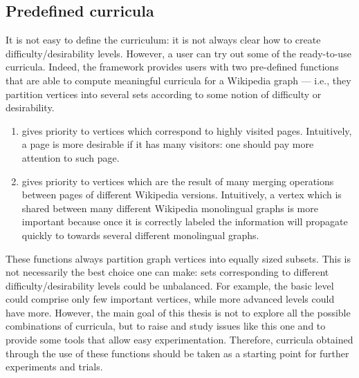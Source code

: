         \subsection{Predefined curricula}
            It is not easy to define the curriculum: it is not always clear how to create difficulty/desirability levels. However, a user can try out some of the ready-to-use curricula. Indeed, the framework provides users with two pre-defined functions that are able to compute meaningful curricula for a Wikipedia graph --- i.e., they partition vertices into several sets according to some notion of difficulty or desirability.
            \begin{enumerate}
                \item {} gives priority to vertices which correspond to highly visited pages. Intuitively, a page is more desirable if it has many visitors: one should pay more attention to such page.
                \item {} gives priority to vertices which are the result of many merging operations between pages of different Wikipedia versions. Intuitively, a vertex which is shared between many different Wikipedia monolingual graphs is more important because once it is correctly labeled the information will propagate quickly to towards several different monolingual graphs.
            \end{enumerate}
            
            These functions always partition graph vertices into equally sized subsets. This is not necessarily the best choice one can make: sets corresponding to different difficulty/desirability levels could be unbalanced. For example, the basic level could comprise only few important vertices, while more advanced levels could have more. However, the main goal of this thesis is not to explore all the possible combinations of curricula, but to raise and study issues like this one and to provide some tools that allow easy experimentation. Therefore, curricula obtained through the use of these functions should be taken as a starting point for further experiments and trials.
            
